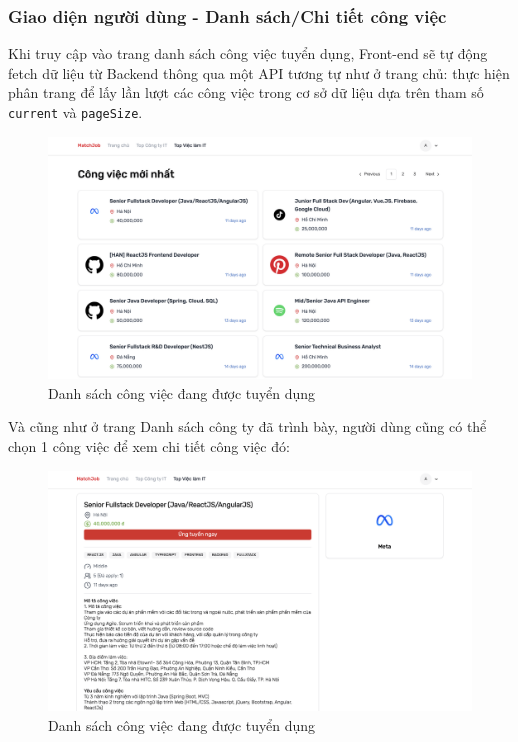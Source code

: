 \subsubsection{Giao diện người dùng - Danh sách/Chi tiết công việc}

Khi truy cập vào trang danh sách công việc tuyển dụng, Front-end sẽ tự động fetch dữ liệu từ Backend thông qua một API tương tự như ở trang chủ: thực hiện phân trang để lấy lần lượt các công việc trong cơ sở dữ liệu dựa trên tham số \texttt{current} và \texttt{pageSize}.

\begin{figure}[H]
    \centering
    \includegraphics[width=\linewidth]{DBMS-Application/Images/list-job.png}
    \caption{Danh sách công việc đang được tuyển dụng}
\end{figure}

Và cũng như ở trang Danh sách công ty đã trình bày, người dùng cũng có thể chọn 1 công việc để xem chi tiết công việc đó:

\begin{figure}[H]
    \centering
    \includegraphics[width=\linewidth]{DBMS-Application/Images/job-detail.png}
    \caption{Danh sách công việc đang được tuyển dụng}
\end{figure}


